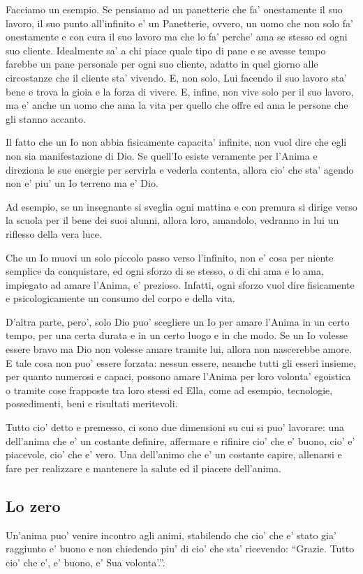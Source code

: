 Facciamo un esempio. Se pensiamo ad un panetterie che fa' onestamente il suo lavoro, il suo punto all'infinito e' un Panetterie, ovvero, un uomo che non solo fa' onestamente e con cura il suo lavoro ma che lo fa' perche' ama se stesso ed ogni suo cliente. Idealmente sa' a chi piace quale tipo di pane e se avesse tempo farebbe un pane personale per ogni suo cliente, adatto in quel giorno alle circostanze che il cliente sta' vivendo. E, non solo, Lui facendo il suo lavoro sta' bene e trova la gioia e la forza di vivere. E, infine, non vive solo per il suo lavoro, ma e' anche un uomo che ama la vita per quello che offre ed ama le persone che gli stanno accanto.

Il fatto che un Io non abbia fisicamente capacita' infinite, non vuol dire che egli non sia manifestazione di Dio. Se quell'Io esiste veramente per l'Anima e direziona le sue energie per servirla e vederla contenta, allora cio' che sta' agendo non e' piu' un Io terreno ma e' Dio.

Ad esempio, se un insegnante si sveglia ogni mattina e con premura si dirige verso la scuola per il bene dei suoi alunni, allora loro, amandolo, vedranno in lui un riflesso della vera luce.

Che un Io muovi un solo piccolo passo verso l'infinito, non e' cosa per niente semplice da conquistare, ed ogni sforzo di se stesso, o di chi ama e lo ama, impiegato ad amare l'Anima, e' prezioso. Infatti, ogni sforzo vuol dire fisicamente e psicologicamente un consumo del corpo e della vita.

D'altra parte, pero', solo Dio puo' scegliere un Io per amare l'Anima in un certo tempo, per una certa durata e in un certo luogo e in che modo. Se un Io volesse essere bravo ma Dio non volesse amare tramite lui, allora non nascerebbe amore. E tale cosa non puo' essere forzata: nessun essere, neanche tutti gli esseri insieme, per quanto numerosi e capaci, possono amare l'Anima per loro volonta' egoistica o tramite cose frapposte tra loro stessi ed Ella, come ad esempio, tecnologie, possedimenti, beni e risultati meritevoli. 

Tutto cio' detto e premesso, ci sono due dimensioni su cui si puo' lavorare: una dell'anima che e' un costante definire, affermare e rifinire cio' che e' buono, cio' e' piacevole, cio' che e' vero. Una dell'animo che e' un costante capire, allenarsi e fare per realizzare e mantenere la salute ed il piacere dell'anima.

\subsection{Lo zero}
\label{loZero}
Un'anima puo' venire incontro agli animi, stabilendo che cio' che e' stato gia' raggiunto e' buono e non chiedendo piu' di cio' che sta' ricevendo: ``Grazie. Tutto cio' che e', e' buono, e' Sua volonta'.''.

